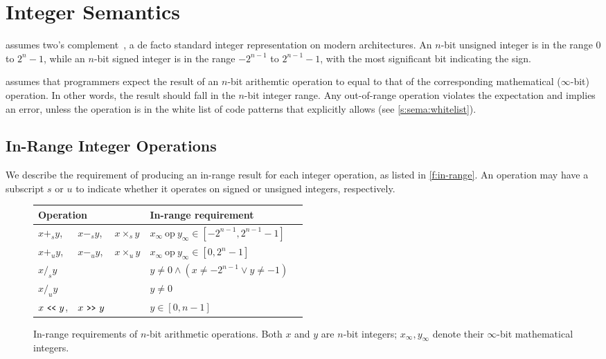 \section{Integer Semantics}
\label{s:sema}

\sys assumes two's complement~\cite[4.2.1]{intel:vol1},
a de facto standard integer representation on modern architectures.
An $n$-bit unsigned integer is in the range $0$ to $2^n-1$, while
an $n$-bit signed integer is in the range $-2^{n-1}$ to $2^{n-1}-1$,
with the most significant bit indicating the sign.

\sys assumes that programmers expect the result of an $n$-bit
arithemtic operation to equal to that of the corresponding mathematical
($\infty$-bit) operation.
In other words, the result should fall in the $n$-bit integer range.
%
Any out-of-range operation violates the expectation and implies an
error, unless the operation is in the white list of code patterns
that \sys explicitly allows (see \autoref{s:sema:whitelist}).

\subsection{In-Range Integer Operations}
\label{s:sema:sec}

We describe the requirement of producing an in-range result for each
integer operation, as listed in \autoref{f:in-range}.
%
An operation may have a subscript $s$ or $u$ to indicate whether
it operates on signed or unsigned integers, respectively.

\begin{figure}
\small
\centering
\begin{tabular}{l@{ }l@{ }lll}\toprule
\multicolumn{3}{l}{Operation} & In-range requirement \\
\midrule
$x +_s y$, & $x -_s y$, & $x \times_s y$
& $x_{\infty}\ \textrm{op}\ y_{\infty} \in [-2^{n-1}, 2^{n-1}-1]$
\\
$x +_u y$, & $x -_u y$, & $x \times_u y$
& $x_{\infty}\ \textrm{op}\ y_{\infty} \in [0, 2^n-1]$
\\
$x /_s y$ & &
& $y \neq 0 \land (x \neq -2^{n-1} \lor y \neq -1) $
\\
$x /_u y$ & &
& $y \neq 0$
\\
$ x \shl y$, & $x \shr y$ &
& $y \in [0, n-1]$
\\
\bottomrule
\end{tabular}
\caption{In-range requirements of $n$-bit arithmetic operations.
Both $x$ and $y$ are $n$-bit integers; $x_{\infty}, y_{\infty}$
denote their $\infty$-bit mathematical integers.}
\label{f:in-range}
\end{figure}

